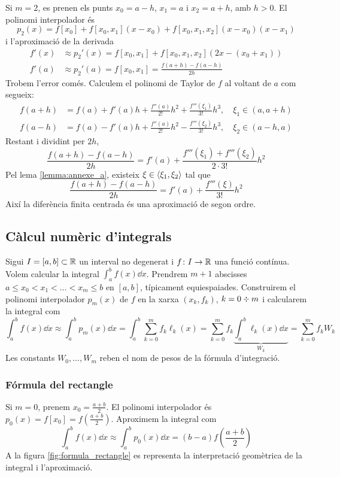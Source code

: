 Si $m = 2$, es prenen els punts $x_0 = a - h$, $x_1 = a$ i $x_2 = a + h$, amb $h > 0$. El polinomi interpolador és
\[
	p_2(x) = f[x_0] + f[x_0,x_1] (x - x_0) + f[x_0,x_1,x_2] (x - x_0) (x - x_1)
\]
i l'aproximació de la derivada
\begin{align*}
	f'(x) &\approx p_2'(x) = f[x_0,x_1] + f[x_0,x_1,x_2] (2 x - (x_0 + x_1)) \\
	f'(a) &\approx p_2'(a) = f[x_0,x_1] = \frac{f(a + h) - f(a - h)}{2 h}
\end{align*}
Trobem l'error comés. Calculem el polinomi de Taylor de $f$ al voltant de $a$ com segueix:
\begin{align*}
	f(a + h) &= f(a) + f'(a) h + \frac{f''(a)}{2!} h^2 + \frac{f'''(\xi_1)}{3!} h^3, 
	\quad \xi_1 \in (a, a + h) \\
	f(a - h) &= f(a) - f'(a) h + \frac{f''(a)}{2!} h^2 - \frac{f'''(\xi_2)}{3!} h^3, 
	\quad \xi_2 \in (a-h, a)
\end{align*}
Restant i dividint per $2 h$,
\[
	\frac{f(a + h) - f(a - h)}{2 h} = f'(a) + \frac{f'''(\xi_1) + f'''(\xi_2)}{2 \cdot 3!} h^2
\]
Pel lema \ref{lemma:annexe_a}, existeix $\xi \in \langle \xi_1, \xi_2 \rangle$ tal que
\[
	\frac{f(a + h) - f(a - h)}{2 h} = f'(a) + \frac{f'''(\xi)}{3!} h^2
\]
Així la diferència finita centrada és una aproximació de segon ordre.

\subsection{Càlcul numèric d'integrals} 


Sigui $I = [a, b] \subset \mathbb{R}$ un interval no degenerat i $f \colon I \rightarrow \mathbb{R}$ una funció contínua. Volem calcular la integral $\int_a^b f(x) \dd{x}$. Prendrem $m + 1$ abscisses $a \leq x_0 < x_1 < \ldots < x_m \leq b$ en $[a,b]$, típicament equiespaiades. Construirem el polinomi interpolador $p_m(x)$ de $f$ en la xarxa $(x_k,f_k)$, $k = 0 \divisionsymbol m$ i calcularem la integral com
\[
	\int_a^b f(x) \dd{x} \approx 
	\int_a^b p_m(x) \dd{x} = 
	\int_a^b \sum_{k=0}^m f_k \ell_k(x) = 
	\sum_{k=0}^m f_k \underbrace{\int_a^b \ell_k(x) \dd{x}}_{W_k} = 
	\sum_{k=0}^m f_k W_k 
\]
Les constants $W_0, \ldots, W_m$ reben el nom de pesos de la fórmula d'integració.

\subsubsection*{Fórmula del rectangle}

Si $m = 0$, prenem $x_0 = \frac{a + b}{2}$. El polinomi interpolador és $p_0(x) = f[x_0] = f\left(\frac{a + b}{2}\right)$. Aproximem la integral com
\[
	\int_a^b f(x) \dd{x} \approx \int_a^b p_0(x) \dd{x} = (b - a) f\left(\frac{a + b}{2}\right)
\]
A la figura \ref{fig:formula_rectangle} es representa la interpretació geomètrica de la integral i l'aproximació.

